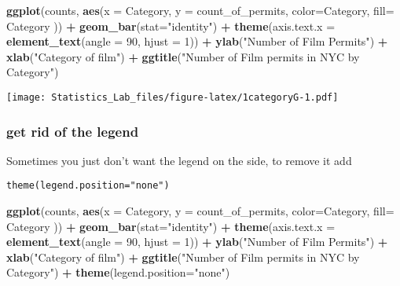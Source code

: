 \documentclass[
]{book}
\newenvironment{Shaded}{\begin{snugshade}}{\end{snugshade}}
\newcommand{\AttributeTok}[1]{\textcolor[rgb]{0.13,0.29,0.53}{#1}}
\newcommand{\DecValTok}[1]{\textcolor[rgb]{0.00,0.00,0.81}{#1}}
\newcommand{\FunctionTok}[1]{\textcolor[rgb]{0.13,0.29,0.53}{\textbf{#1}}}
\newcommand{\NormalTok}[1]{#1}
\newcommand{\SpecialCharTok}[1]{\textcolor[rgb]{0.81,0.36,0.00}{\textbf{#1}}}
\newcommand{\StringTok}[1]{\textcolor[rgb]{0.31,0.60,0.02}{#1}}
\begin{document}
\begin{Shaded}
\begin{Highlighting}[]
\FunctionTok{ggplot}\NormalTok{(counts, }\FunctionTok{aes}\NormalTok{(}\AttributeTok{x =}\NormalTok{ Category, }\AttributeTok{y =}\NormalTok{ count\_of\_permits, }
                   \AttributeTok{color=}\NormalTok{Category, }
                   \AttributeTok{fill=}\NormalTok{ Category )) }\SpecialCharTok{+}
  \FunctionTok{geom\_bar}\NormalTok{(}\AttributeTok{stat=}\StringTok{"identity"}\NormalTok{) }\SpecialCharTok{+} 
  \FunctionTok{theme}\NormalTok{(}\AttributeTok{axis.text.x =} \FunctionTok{element\_text}\NormalTok{(}\AttributeTok{angle =} \DecValTok{90}\NormalTok{, }\AttributeTok{hjust =} \DecValTok{1}\NormalTok{)) }\SpecialCharTok{+}
  \FunctionTok{ylab}\NormalTok{(}\StringTok{"Number of Film Permits"}\NormalTok{) }\SpecialCharTok{+} 
  \FunctionTok{xlab}\NormalTok{(}\StringTok{"Category of film"}\NormalTok{) }\SpecialCharTok{+}
  \FunctionTok{ggtitle}\NormalTok{(}\StringTok{"Number of Film permits in NYC by Category"}\NormalTok{)}
\end{Highlighting}
\end{Shaded}

\texttt{[image: Statistics\_Lab\_files/figure-latex/1categoryG-1.pdf]}

\hypertarget{get-rid-of-the-legend}{%
\subsubsection{get rid of the legend}\label{get-rid-of-the-legend}}

Sometimes you just don't want the legend on the side, to remove it add

\texttt{theme(legend.position="none")}

\begin{Shaded}
\begin{Highlighting}[]
\FunctionTok{ggplot}\NormalTok{(counts, }\FunctionTok{aes}\NormalTok{(}\AttributeTok{x =}\NormalTok{ Category, }\AttributeTok{y =}\NormalTok{ count\_of\_permits, }
                   \AttributeTok{color=}\NormalTok{Category, }
                   \AttributeTok{fill=}\NormalTok{ Category )) }\SpecialCharTok{+}
  \FunctionTok{geom\_bar}\NormalTok{(}\AttributeTok{stat=}\StringTok{"identity"}\NormalTok{) }\SpecialCharTok{+} 
  \FunctionTok{theme}\NormalTok{(}\AttributeTok{axis.text.x =} \FunctionTok{element\_text}\NormalTok{(}\AttributeTok{angle =} \DecValTok{90}\NormalTok{, }\AttributeTok{hjust =} \DecValTok{1}\NormalTok{)) }\SpecialCharTok{+}
  \FunctionTok{ylab}\NormalTok{(}\StringTok{"Number of Film Permits"}\NormalTok{) }\SpecialCharTok{+} 
  \FunctionTok{xlab}\NormalTok{(}\StringTok{"Category of film"}\NormalTok{) }\SpecialCharTok{+}
  \FunctionTok{ggtitle}\NormalTok{(}\StringTok{"Number of Film permits in NYC by Category"}\NormalTok{) }\SpecialCharTok{+}
  \FunctionTok{theme}\NormalTok{(}\AttributeTok{legend.position=}\StringTok{"none"}\NormalTok{)}
\end{Highlighting}
\end{Shaded}
\end{document}

